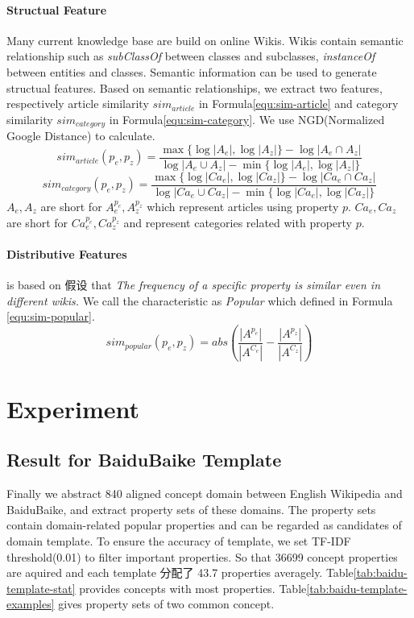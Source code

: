 \documentclass[runningheads,a4paper]{llncs}
\begin{document}
\paragraph{Structual Feature}
Many current knowledge base are build on online Wikis. Wikis contain semantic relationship such as \textit{subClassOf} between classes and subclasses, \textit{instanceOf} between entities and classes. Semantic information can be used to generate structual features\cite{wang2014cross}. Based on semantic relationships, we extract two features, respectively article similarity $sim_{article}$ in Formula\ref{equ:sim-article} and category similarity $sim_{category}$ in Formula\ref{equ:sim-category}. We use NGD(Normalized Google Distance) to calculate.
\begin{equation}
\label{equ:sim-article}
sim_{article}(p_e, p_z) = \frac{\max\{\log |A_e|, \log |A_z|\} - \log|A_e \cap A_z|}
{\log |A_e \cup A_z| - \min\{\log |A_e|, \log |A_z|\}}
\end{equation}
\begin{equation}
\label{equ:sim-category}
sim_{category}(p_e, p_z) = \frac{\max\{\log |Ca_e|, \log |Ca_z|\} - \log|Ca_e \cap Ca_z|}
{\log |Ca_e \cup Ca_z| - \min\{\log |Ca_e|, \log |Ca_z|\}}
\end{equation}
$A_e, A_z$ are short for $A_e^{p_e},A_z^{p_z}$ which represent articles using property $p$. $Ca_e, Ca_z$ are short for $Ca_e^{p_e}, Ca_z^{p_z}$ and represent categories related with property $p$.

\paragraph{Distributive Features}
is based on 假设 that \textit{The frequency of a specific property is similar even in different wikis.} We call the characteristic as \textit{Popular} which defined in Formula \ref{equ:sim-popular}.
\begin{equation}
\label{equ:sim-popular}
sim_{popular}(p_e, p_z) = abs(\frac{|A^{p_e}|}{|A^{C_e}|} - \frac{|A^{p_z}|}{|A^{C_z}|})
\end{equation}

\section{Experiment}
\subsection{Result for BaiduBaike Template}
Finally we abstract 840 aligned concept domain between English Wikipedia and BaiduBaike, and extract property sets of these domains. The property sets contain domain-related popular properties and can be regarded as candidates of domain template. To ensure the accuracy of template, we set TF-IDF threshold(0.01) to filter important properties. So that 36699 concept properties are aquired and each template 分配了 43.7 properties averagely. Table\ref{tab:baidu-template-stat} provides concepts with most properties. Table\ref{tab:baidu-template-examples} gives property sets of two common concept.
\end{document}
